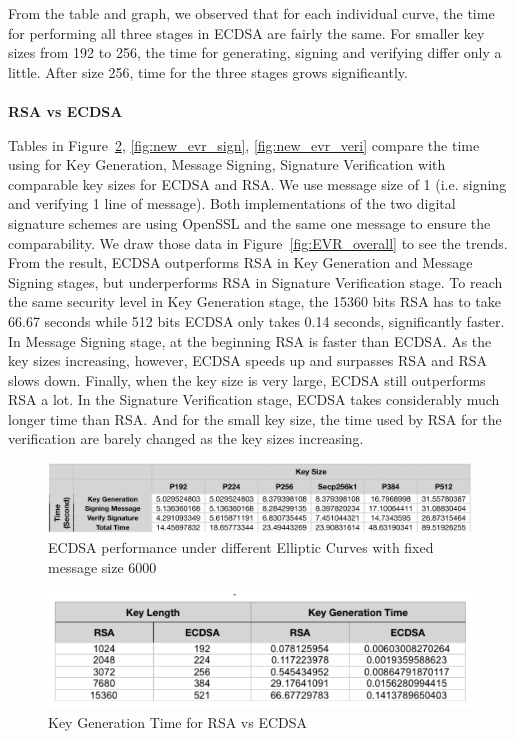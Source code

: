 \documentclass[10pt,sigconf]{acmart}
\begin{document}
From the table and graph, we observed that for each individual curve, the time for performing all three stages in ECDSA are fairly the same. For smaller key sizes from 192 to 256, the time for generating, signing and verifying differ only a little. After size 256, time for the three stages grows significantly. 
\\
\\
\noindent \textbf{RSA vs ECDSA}

Tables in Figure~\ref{fig:new_evr_gen}, \ref{fig:new_evr_sign}, \ref{fig:new_evr_veri} compare the time using for Key Generation, Message Signing, Signature Verification with comparable key sizes for ECDSA and RSA. We use message size of 1 (i.e. signing and verifying 1 line of message). Both implementations of the two digital signature schemes are using OpenSSL and the same one message to ensure the comparability. We draw those data in Figure~\ref{fig:EVR_overall} to see the trends. From the result, ECDSA outperforms RSA in Key Generation and Message Signing stages, but underperforms RSA in Signature Verification stage. To reach the same security level in Key Generation stage, the 15360 bits RSA has to take 66.67 seconds while 512 bits ECDSA only takes 0.14 seconds, significantly faster. In Message Signing stage, at the beginning RSA is faster than ECDSA. As the key sizes increasing, however, ECDSA speeds up and surpasses RSA and RSA slows down. Finally, when the key size is very large, ECDSA still outperforms RSA a lot. In the Signature Verification stage, ECDSA takes considerably much longer time than RSA. And for the small key size, the time used by RSA for the verification are barely changed as the key sizes increasing.

\begin{figure}
\centering
\includegraphics[scale=0.45]{ECDSA_Varying_Keysize_Runtime_Table}
\caption{\small{ECDSA performance under different Elliptic Curves with fixed message size 6000}}
\label{fig:ECDSA_Varying_Keysize_Runtime_Table}
\end{figure}

\begin{figure}[H]
\centering
\includegraphics[scale=0.62]{new_evr_gen}
\caption{\small{Key Generation Time for RSA vs ECDSA}}
\label{fig:new_evr_gen}
\end{figure}
\end{document}
